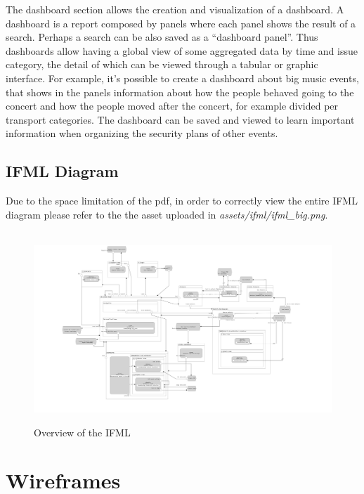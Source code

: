 \documentclass[../main.tex]{subfiles}
\begin{document}
    The dashboard section allows the creation and visualization of a dashboard. A dashboard is a report composed by panels where each panel shows the result of a search. Perhaps a search can be also saved as a “dashboard panel”. Thus dashboards allow having a global view of some aggregated data by time and issue category, the detail of which can be viewed through a tabular or graphic interface. For example, it’s possible to create a dashboard about big music events, that shows in the panels information about how the people behaved going to the concert and how the people moved after the concert, for example divided per transport categories. The dashboard can be saved and viewed to learn important information when organizing the security plans of other events.

    \section{IFML Diagram}\label{sec:ifml-diagram}
    Due to the space limitation of the pdf, in order to correctly view the entire IFML diagram please refer to the the asset uploaded in \textit{assets/ifml/ifml\_big.png}.
    \\
    \\
    \begin{figure}[H]
        \centering
        \includegraphics[scale = 0.05]{assets/ifml/ifml_big.png} \\
        \caption[]{Overview of the IFML}\label{fig:figure4}
    \end{figure}
    \chapter{Wireframes}\label{ch:wireframes}
\end{document}
